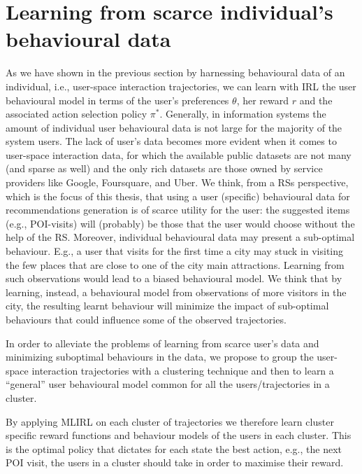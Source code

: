 \section{Learning from scarce individual's behavioural data}
\label{sec:clustering like behaving users}

As we have shown in the previous section by harnessing behavioural data of an individual, i.e., user-space interaction trajectories, we can learn with IRL the user behavioural model in terms of the user's preferences $\theta$, her reward $r$ and the associated action selection policy $\pi^*$. 
Generally, in information systems the amount of individual user behavioural data is not large for the majority of the system users. The lack of user's data becomes more evident when it comes to user-space interaction data, for which the available public datasets are not many (and sparse as well) and the only rich datasets are those owned by service providers like Google, Foursquare, and Uber.
We think, from a RSs perspective, which is the focus of this thesis, that using a user (specific) behavioural data
for recommendations generation is of scarce utility for the user: the suggested items (e.g., POI-visits) will (probably) be those that the user would choose without the help of the RS. Moreover, individual behavioural data may present a sub-optimal behaviour. E.g., a user that visits for the first time a city may stuck in visiting the few places that are close to one of the city main attractions. Learning from such observations would lead to a biased behavioural model. We think that by learning, instead, a behavioural model from observations of more visitors in the city, the resulting learnt behaviour will minimize the impact of sub-optimal behaviours that could influence some of the observed trajectories.

In order to alleviate the problems of learning from scarce user's data and minimizing suboptimal behaviours in the data, we propose to group the user-space interaction trajectories with a clustering technique and then to learn a ``general'' user behavioural model common for all the users/trajectories in a cluster.

By applying MLIRL on each cluster of trajectories we therefore learn cluster specific reward functions and behaviour models of the users in each cluster. This is the optimal policy that dictates for each state the best action, e.g., the next POI visit, the users in a cluster should take in order to maximise their reward.

